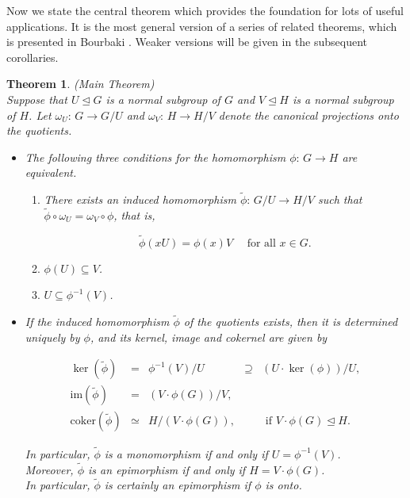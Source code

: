 \documentclass{amsart}
\newtheorem{theorem}{Theorem}[section]
\theoremstyle{definition}
\numberwithin{equation}{section}
\begin{document}
\noindent
Now we state the central theorem
which provides the foundation for lots of useful applications.
It is the most general version of a series of related theorems,
which is presented in Bourbaki
\cite[Chap.1, Structures alg\'ebriques, Prop.5, p. A I.35]{Bb}.
Weaker versions will be given in the subsequent corollaries.


\begin{theorem}
\label{thm:IndHomQtn}
(Main Theorem)\\
Suppose that \(U\unlhd G\) is a normal subgroup of \(G\) and
\(V\unlhd H\) is a normal subgroup of \(H\).
Let \(\omega_U:\,G\to G/U\) and \(\omega_V:\,H\to H/V\)
denote the canonical projections onto the quotients.

\begin{itemize}
\item
The following three conditions for the homomorphism \(\phi:\,G\to H\) are equivalent.
\begin{enumerate}
\item
There exists an induced homomorphism \(\tilde{\phi}:\,G/U\to H/V\)
such that \(\tilde{\phi}\circ\omega_U=\omega_V\circ\phi\),
that is,

\begin{equation}
\label{eqn:IndHomQtn}
\tilde{\phi}(xU)=\phi(x)V \quad\text{ for all } x\in G.
\end{equation}

\item
\(\phi(U)\subseteq V\).
\item
\(U\subseteq\phi^{-1}(V)\).
\end{enumerate}
\item
If the induced homomorphism \(\tilde{\phi}\) of the quotients exists,
then it is determined uniquely by \(\phi\),
and its kernel, image and cokernel are given by

\begin{equation}
\label{eqn:KerImCoKer}
\begin{aligned}
\ker(\tilde{\phi}) &=& \phi^{-1}(V)/U &\supseteq& (U\cdot\ker(\phi))/U,\\
\mathrm{im}(\tilde{\phi}) &=& (V\cdot\phi(G))/V, && \\
\mathrm{coker}(\tilde{\phi}) &\simeq& H/(V\cdot\phi(G)), && \text{ if } V\cdot\phi(G)\unlhd H.
\end{aligned}
\end{equation}

\noindent
In particular, \(\tilde{\phi}\) is a monomorphism
if and only if \(U=\phi^{-1}(V)\).\\
Moreover, \(\tilde{\phi}\) is an epimorphism if and only if \(H=V\cdot\phi(G)\).\\
In particular, \(\tilde{\phi}\) is certainly an epimorphism if \(\phi\) is onto.
\end{itemize}

\end{theorem}
\end{document}
